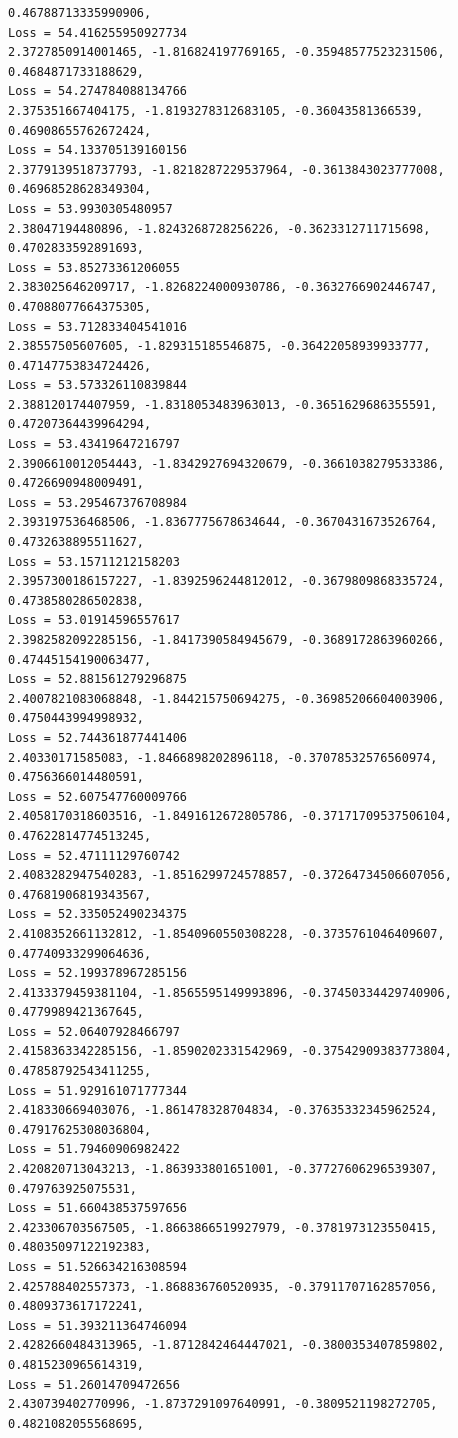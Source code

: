 \documentclass[11pt]{article}
\begin{document}
\begin{Verbatim}[commandchars=\\\{\}]
0.46788713335990906,
Loss = 54.416255950927734
2.3727850914001465, -1.816824197769165, -0.35948577523231506,
0.4684871733188629,
Loss = 54.274784088134766
2.375351667404175, -1.8193278312683105, -0.36043581366539, 0.46908655762672424,
Loss = 54.133705139160156
2.3779139518737793, -1.8218287229537964, -0.3613843023777008,
0.46968528628349304,
Loss = 53.9930305480957
2.38047194480896, -1.8243268728256226, -0.3623312711715698, 0.4702833592891693,
Loss = 53.85273361206055
2.383025646209717, -1.8268224000930786, -0.3632766902446747,
0.47088077664375305,
Loss = 53.712833404541016
2.38557505607605, -1.829315185546875, -0.36422058939933777, 0.47147753834724426,
Loss = 53.573326110839844
2.388120174407959, -1.8318053483963013, -0.3651629686355591,
0.47207364439964294,
Loss = 53.43419647216797
2.3906610012054443, -1.8342927694320679, -0.3661038279533386,
0.4726690948009491,
Loss = 53.295467376708984
2.393197536468506, -1.8367775678634644, -0.3670431673526764, 0.4732638895511627,
Loss = 53.15711212158203
2.3957300186157227, -1.8392596244812012, -0.3679809868335724,
0.4738580286502838,
Loss = 53.01914596557617
2.3982582092285156, -1.8417390584945679, -0.3689172863960266,
0.47445154190063477,
Loss = 52.881561279296875
2.4007821083068848, -1.844215750694275, -0.36985206604003906,
0.4750443994998932,
Loss = 52.744361877441406
2.40330171585083, -1.8466898202896118, -0.37078532576560974, 0.4756366014480591,
Loss = 52.607547760009766
2.4058170318603516, -1.8491612672805786, -0.37171709537506104,
0.47622814774513245,
Loss = 52.47111129760742
2.4083282947540283, -1.8516299724578857, -0.37264734506607056,
0.47681906819343567,
Loss = 52.335052490234375
2.4108352661132812, -1.8540960550308228, -0.3735761046409607,
0.47740933299064636,
Loss = 52.199378967285156
2.4133379459381104, -1.8565595149993896, -0.37450334429740906,
0.4779989421367645,
Loss = 52.06407928466797
2.4158363342285156, -1.8590202331542969, -0.37542909383773804,
0.47858792543411255,
Loss = 51.929161071777344
2.418330669403076, -1.861478328704834, -0.37635332345962524,
0.47917625308036804,
Loss = 51.79460906982422
2.420820713043213, -1.863933801651001, -0.37727606296539307, 0.479763925075531,
Loss = 51.660438537597656
2.423306703567505, -1.8663866519927979, -0.3781973123550415,
0.48035097122192383,
Loss = 51.526634216308594
2.425788402557373, -1.868836760520935, -0.37911707162857056, 0.4809373617172241,
Loss = 51.393211364746094
2.4282660484313965, -1.8712842464447021, -0.3800353407859802,
0.4815230965614319,
Loss = 51.26014709472656
2.430739402770996, -1.8737291097640991, -0.3809521198272705, 0.4821082055568695,

\end{Verbatim}
\end{document}
